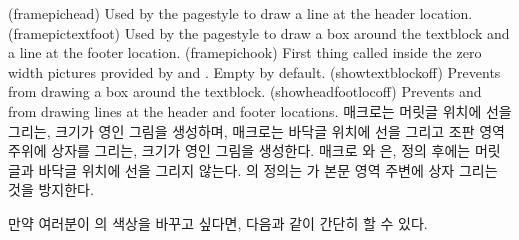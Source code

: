 \begin{syntax}
\cmd{\framepichead} \\
\cmd{\framepictextfoot} \\
\cmd{\framepichook} \\
\cmd{\showheadfootlocoff} \\
\cmd{\showtextblockoff} \\
\end{syntax}
\glossary(framepichead)%
  {}%
  {Used by the  pagestyle to draw a line at the header 
   location.}
\glossary(framepictextfoot)%
  {}%
  {Used by the  pagestyle to draw a box around the textblock
   and a line at the footer location.}
\glossary(framepichook)%
  {}%
  {First thing called inside the zero width pictures provided by
     and . Empty by default.}%
\glossary(showtextblockoff)%
  {}%
  {Prevents  from drawing a box around the textblock.}
\glossary(showheadfootlocoff)%
  {}%
  {Prevents  and  from drawing
   lines at the header and footer locations.}
%
\cmd{\framepichead} 매크로는 머릿글 위치에 선을 그리는, 크기가 영인
그림을 생성하며,
\cmd{\framepictextfoot} 매크로는 바닥글 위치에 선을 그리고 조판 영역 주위에
상자를 그리는, 크기가 영인 그림을
생성한다.
매크로 \cmd{\framepichead}와 \cmd{\framepictextfoot}은,
\cmd{\showheadfootlocoff} 정의 후에는 머릿글과 바닥글 위치에 선을 그리지
않는다.
\cmd{\showtextblockoff}의 정의는 \cmd{\framepictextfoot}가 본문 영역 주변에
상자 그리는 것을 방지한다.

만약 여러분이 의 색상을 바꾸고 싶다면, 다음과 같이 간단히 할
수 있다.
\begin{lcode}
  \renewcommand\framepichook{\color{red}}
\end{lcode}




